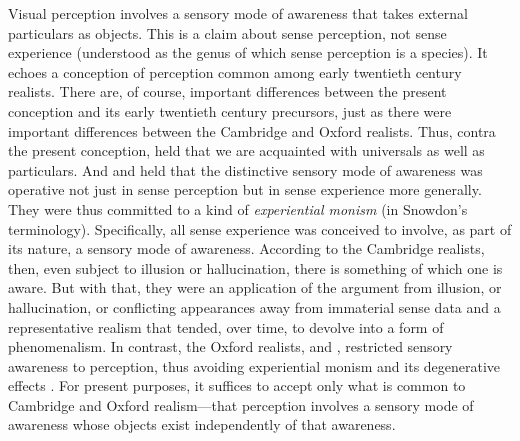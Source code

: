 \documentclass[12pt]{article}
\begin{document}
Visual perception involves a sensory mode of awareness that takes external particulars as objects. This is a claim about sense perception, not sense experience (understood as the genus of which sense perception is a species). It echoes a conception of perception common among early twentieth century realists. There are, of course, important differences between the present conception and its early twentieth century precursors, just as there were important differences between the Cambridge and Oxford realists. Thus, contra the present conception, \citet[]{Russell:1912uq} held that we are acquainted with universals as well as particulars. And \citet[]{Russell:1912uq} and \citet[]{Price:1932fk} held that the distinctive sensory mode of awareness was operative not just in sense perception but in sense experience more generally. They were thus committed to a kind of \emph{experiential monism} (in Snowdon's \citeyear{Snowdon:2008oz} terminology). Specifically, all sense experience was conceived to involve, as part of its nature, a sensory mode of awareness. According to the Cambridge realists, then, even subject to illusion or hallucination, there is something of which one is aware. But with that, they were an application of the argument from illusion, or hallucination, or conflicting appearances away from immaterial sense data and a representative realism that tended, over time, to devolve into a form of phenomenalism. In contrast, the Oxford realists, \citet{Cook-Wilson:1926sf} and \citet[]{Prichard:1906gf,Prichard:1909yg}, restricted sensory awareness to perception, thus avoiding experiential monism and its degenerative effects \citep[see][]{Marion:2000kl,Marion:2000ai,Kalderon:2010fk}. For present purposes, it suffices to accept only what is common to Cambridge and Oxford realism---that perception involves a sensory mode of awareness whose objects exist independently of that awareness. 
\end{document}
